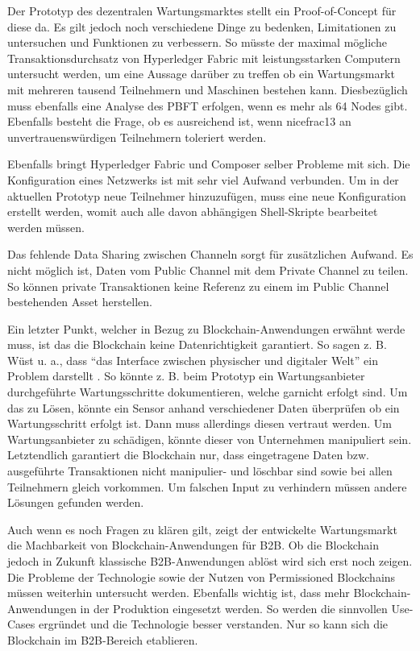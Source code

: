 Der Prototyp des dezentralen Wartungsmarktes stellt ein Proof-of-Concept für diese da. Es gilt jedoch noch verschiedene Dinge zu bedenken, Limitationen zu untersuchen und Funktionen zu verbessern. So müsste der maximal mögliche Transaktionsdurchsatz von Hyperledger Fabric mit leistungsstarken Computern untersucht werden, um eine Aussage darüber zu treffen ob ein Wartungsmarkt mit mehreren tausend Teilnehmern und Maschinen bestehen kann. Diesbezüglich muss ebenfalls eine Analyse des PBFT erfolgen, wenn es mehr als 64 Nodes gibt. Ebenfalls besteht die Frage, ob es ausreichend ist, wenn nicefrac{1}{3} an unvertrauenswürdigen Teilnehmern toleriert werden.

Ebenfalls bringt Hyperledger Fabric und Composer selber Probleme mit sich. Die Konfiguration eines Netzwerks ist mit sehr viel Aufwand verbunden. Um in der aktuellen Prototyp neue Teilnehmer hinzuzufügen, muss eine neue Konfiguration erstellt werden, womit auch alle davon abhängigen Shell-Skripte bearbeitet werden müssen. 

Das fehlende Data Sharing zwischen Channeln sorgt für zusätzlichen Aufwand. Es nicht möglich ist, Daten vom Public Channel mit dem Private Channel zu teilen. So können private Transaktionen keine Referenz zu einem im Public Channel bestehenden Asset herstellen.

Ein letzter Punkt, welcher in Bezug zu Blockchain-Anwendungen erwähnt werde muss, ist das die Blockchain keine Datenrichtigkeit garantiert. So sagen z. B. Wüst u. a., dass ``das Interface zwischen physischer und digitaler Welt'' ein Problem darstellt \cite{WustyouneedBlockchain2017}. So könnte z. B. beim Prototyp ein Wartungsanbieter durchgeführte Wartungsschritte dokumentieren, welche garnicht erfolgt sind. Um das zu Lösen, könnte ein Sensor anhand verschiedener Daten überprüfen ob ein Wartungsschritt erfolgt ist. Dann muss allerdings diesen vertraut werden. Um Wartungsanbieter zu schädigen, könnte dieser von Unternehmen manipuliert sein. Letztendlich garantiert die Blockchain nur, dass eingetragene Daten bzw. ausgeführte Transaktionen nicht manipulier- und löschbar sind sowie bei allen Teilnehmern gleich vorkommen. Um falschen Input zu verhindern müssen andere Lösungen gefunden werden.

Auch wenn es noch Fragen zu klären gilt, zeigt der entwickelte Wartungsmarkt die Machbarkeit von Blockchain-Anwendungen für B2B. Ob die Blockchain jedoch in Zukunft klassische B2B-Anwendungen ablöst wird sich erst noch zeigen. Die Probleme der Technologie sowie der Nutzen von Permissioned Blockchains müssen weiterhin untersucht werden. Ebenfalls wichtig ist, dass mehr Blockchain-Anwendungen in der Produktion eingesetzt werden. So werden die sinnvollen Use-Cases ergründet und die Technologie besser verstanden. Nur so kann sich die Blockchain im B2B-Bereich etablieren.




